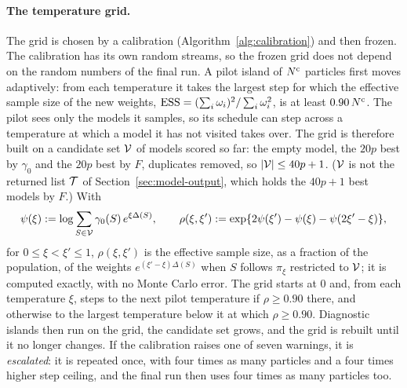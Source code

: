 \paragraph{The temperature grid.} The grid is chosen by a calibration (Algorithm~\ref{alg:calibration}) and then
frozen. The calibration has its own random streams, so the frozen grid does not depend on the random numbers of the
final run. A pilot island of $N^{\mathrm c}$ particles first moves adaptively: from each temperature it takes the largest step
for which the effective sample size of the new weights, $\mathrm{ESS}=(\sum_i\omega_i)^2/\sum_i\omega_i^2$, is at least
$0.90\,N^{\mathrm c}$. The pilot sees only the models it samples, so its schedule can step across a temperature at which a model
it has not visited takes over. The grid is therefore built on a candidate set $\mathcal V$ of models scored so far: the
empty model, the $20p$ best by $\gamma_0$ and the $20p$ best by $F$, duplicates removed, so $\lvert \mathcal V\rvert\le40p+1$. ($\mathcal V$ is not the returned list $\mathcal T$ of
Section~\ref{sec:model-output}, which holds the $40p+1$ best models by $F$.) With
\begin{equation}\label{eq:ress}
  \psi(\xi):=\log\sum_{S\in\mathcal V}\gamma_0(S)\,e^{\xi\Delta(S)},\qquad
  \rho(\xi,\xi'):=\exp\{2\psi(\xi')-\psi(\xi)-\psi(2\xi'-\xi)\},
\end{equation}
for $0\le\xi<\xi'\le1$, $\rho(\xi,\xi')$ is the effective sample size, as a fraction of the population, of the weights
$e^{(\xi'-\xi)\Delta(S)}$ when $S$ follows $\pi_\xi$ restricted to $\mathcal V$; it is computed exactly, with no Monte Carlo error. The grid starts at $0$
and, from each temperature $\xi$, steps to the next pilot temperature if $\rho\ge0.90$ there, and otherwise to the
largest temperature below it at which $\rho\ge0.90$. Diagnostic islands then run on the grid, the candidate set
grows, and the grid is rebuilt until it no longer changes. If the calibration raises one of seven warnings, it is
\emph{escalated}: it is repeated once, with four times as many particles and a four times higher step ceiling, and
the final run then uses four times as many particles too.

